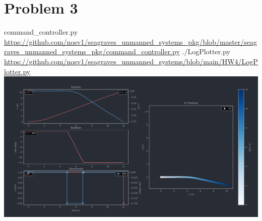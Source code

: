 \documentclass{article}
\begin{document}
    \section*{Problem 3}
        \raggedright
        command\_controller.py \break
        \url{https://github.com/nosv1/seagraves_unmanned_systems_pkg/blob/master/seagraves_unmanned_systems_pkg/command_controller.py} \break
        ./LogPlotter.py \break
        \url{https://github.com/nosv1/seagraves_unmanned_systems/blob/main/HW4/LogPlotter.py} \break
        \includegraphics[width=\linewidth]{Problem 3 Telemetry.png}
    
\end{document}

